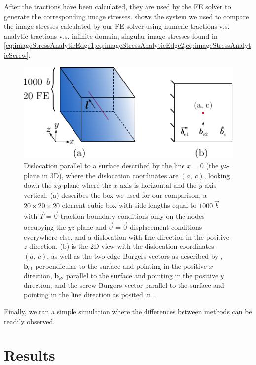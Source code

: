 \documentclass[11pt]{iopart}
\begin{document}
After the tractions have been calculated, they are used by the FE solver to generate the corresponding image stresses.  shows the system we used to compare the image stresses calculated by our FE solver using numeric tractions v.s. analytic tractions v.s. infinite-domain, singular image stresses found in \cref{eq:imageStressAnalyticEdge1,eq:imageStressAnalyticEdge2,eq:imageStressAnalyticScrew}.
\begin{figure}
    \centering
    \includegraphics[width=0.8\linewidth]{head_vs_fe_tractions_setup_diagram.pdf}
    \caption{Dislocation parallel to a surface described by the line $x = 0$ (the $yz$-plane in 3D), where the dislocation coordinates are $(a,~c)$, looking down the $xy$-plane where the $x$-axis is horizontal and the $y$-axis vertical. (a) describes the box we used for our comparison, a  $20 \times 20 \times 20$ element cubic box with side lengths equal to $1000~ \vec{b}$ with $\vec{T} = \vec{0}$ traction boundary conditions only on the nodes occupying the $yz$-plane and $\vec{U} = \vec{0}$ displacement conditions everywhere else, and a dislocation with line direction in the positive $z$ direction. (b) is the 2D view with the dislocation coordinates $(a,~c)$, as well as the two edge Burgers vectors as described by \cite{head1953edge}, $\bm{b}_\textrm{e1}$ perpendicular to the surface and pointing in the positive $x$ direction, $\bm{b}_\textrm{e2}$ parallel to the surface and pointing in the positive $y$ direction; and the screw Burgers vector parallel to the surface and pointing in the line direction as posited in \cite{hirth1983theory}.}
    \label{f:headvstractionfem}
\end{figure}

Finally, we ran a simple simulation where the differences between methods can be readily observed.

\section{Results}
\end{document}
